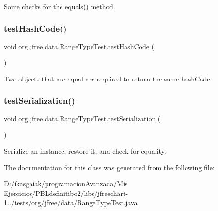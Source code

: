 Some checks for the equals() method. \mbox{\label{classorg_1_1jfree_1_1data_1_1_range_type_test_accdcc123a6d3bccb944566dc4acd675c}} 
\subsubsection{\texorpdfstring{test\+Hash\+Code()}{testHashCode()}}
{\footnotesize\ttfamily void org.\+jfree.\+data.\+Range\+Type\+Test.\+test\+Hash\+Code (\begin{DoxyParamCaption}{ }\end{DoxyParamCaption})}

Two objects that are equal are required to return the same hash\+Code. \mbox{\label{classorg_1_1jfree_1_1data_1_1_range_type_test_aa2622e2003a63da460187ca6d7f2c7a0}} 
\subsubsection{\texorpdfstring{test\+Serialization()}{testSerialization()}}
{\footnotesize\ttfamily void org.\+jfree.\+data.\+Range\+Type\+Test.\+test\+Serialization (\begin{DoxyParamCaption}{ }\end{DoxyParamCaption})}

Serialize an instance, restore it, and check for equality. 

The documentation for this class was generated from the following file\+:\begin{DoxyCompactItemize}
\item 
D\+:/ikasgaiak/programacion\+Avanzada/\+Mis Ejercicios/\+P\+B\+Ldefinitibo2/libs/jfreechart-\/1../tests/org/jfree/data/\mbox{\hyperlink{_range_type_test_8java}{Range\+Type\+Test.\+java}}\end{DoxyCompactItemize}
